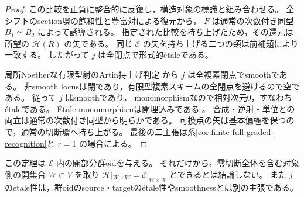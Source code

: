 \begin{proof}
この比較を正負に整合的に反復し，構造対象の標識と組み合わせる。
全シフトのsection環の飽和性と豊富対による復元から，
$F$ は通常の次数付き同型 $B_1\simeq B_2$ によって誘導される。
指定された比較を持ち上げたため，その還元は所望の $\mathcal H(R)$ の矢である。
同じ $\mathcal E$ の矢を持ち上げる二つの類は前補題により一致する。
したがって $j$ は全閉点で形式的\'{e}taleである。

局所Noetherな有限型射のArtin持上げ判定
\cite[Tag 02HY]{StacksProject}から $j$ は全複素閉点でsmoothである。
非smooth locusは閉であり，有限型複素スキームの全閉点を避けるので空である。
従って $j$ はsmoothであり，
monomorphismなので相対次元0，すなわち\'{e}taleである。
\'{E}tale monomorphismは開埋込みである
\cite[Tag 025G]{StacksProject}。
合成・逆射・単位との両立は通常の次数付き同型から明らかである。
可換点の矢は基本偏極を保つので，通常の切断環へ持ち上がる。
最後の二主張は系\ref{cor:finite-full-graded-recognition}と $r=1$ の場合による。
\end{proof}

\begin{remark}[矢の開性と対象の開近傍は異なる]
この定理は $\mathcal E$ 内の開部分群oidを与える。
それだけから，零切断全体を含む対象側の開集合 $W\subset V$ を取り
$\mathcal H|_{W\times W}=\mathcal E|_{W\times W}$ とできるとは結論しない。
また $j$ の\'{e}tale性は，群oidのsource・targetの\'{e}tale性やsmoothnessとは別の主張である。
\end{remark}

